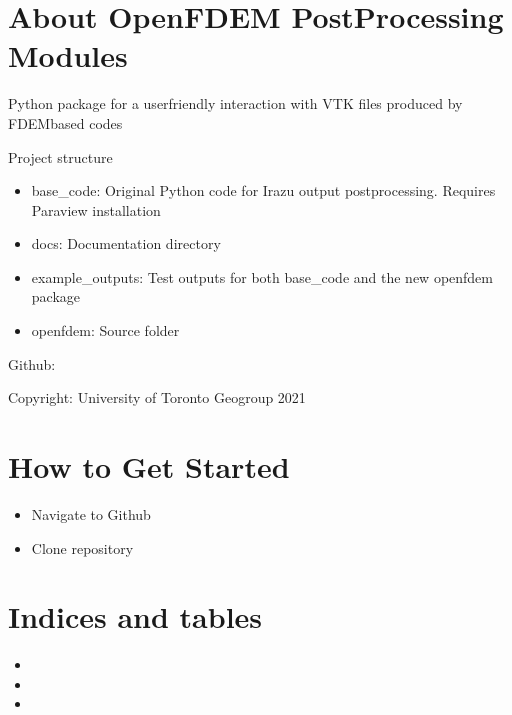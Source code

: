 \documentclass[letterpaper,10pt,english]{sphinxmanual}
\begin{document}
\chapter{About OpenFDEM Post\sphinxhyphen{}Processing Modules}
\label{\detokenize{about:about-openfdem-post-processing-modules}}\label{\detokenize{about::doc}}
Python package for a user\sphinxhyphen{}friendly interaction with VTK files produced by FDEM\sphinxhyphen{}based codes

Project structure
\begin{itemize}
\item {} 
base\_code: Original Python code for Irazu output post\sphinxhyphen{}processing. Requires Paraview installation

\item {} 
docs: Documentation directory

\item {} 
example\_outputs: Test outputs for both base\_code and the new openfdem package

\item {} 
openfdem: Source folder

\end{itemize}

Github: 

Copyright: University of Toronto Geogroup 2021


\chapter{How to Get Started}
\label{\detokenize{gettingstarted:how-to-get-started}}\label{\detokenize{gettingstarted::doc}}\begin{itemize}
\item {} 
Navigate to Github

\item {} 
Clone repository

\end{itemize}


\chapter{Indices and tables}
\label{\detokenize{index:indices-and-tables}}\begin{itemize}
\item {} 

\item {} 

\item {} 

\end{itemize}
\end{document}
